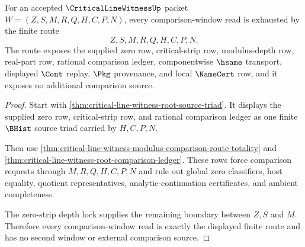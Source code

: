 \begin{theorem}
\label{thm:critical-line-witness-comparison-window-totality}
For an accepted $\CriticalLineWitnessUp$ packet $W=(Z,S,M,R,Q,H,C,P,N)$, every comparison-window read is exhausted by the finite route
$$
Z,S,M,R,Q,H,C,P,N.
$$
The route exposes the supplied zero row, critical-strip row, modulus-depth row, real-part row, rational comparison ledger, componentwise $\hsame$ transport, displayed $\Cont$ replay, $\Pkg$ provenance, and local $\NameCert$ row, and it exposes no additional comparison source.
\end{theorem}
\begin{proof}
Start with \autoref{thm:critical-line-witness-root-source-triad}. It displays the supplied zero row, critical-strip row, and rational comparison ledger as one finite $\BHist$ source triad carried by $H,C,P,N$.

Then use \autoref{thm:critical-line-witness-modulus-comparison-route-totality} and \autoref{thm:critical-line-witness-root-comparison-ledger}. These rows force comparison requests through $M,R,Q,H,C,P,N$ and rule out global zero classifiers, host equality, quotient representatives, analytic-continuation certificates, and ambient completeness.

The zero-strip depth lock supplies the remaining boundary between $Z,S$ and $M$. Therefore every comparison-window read is exactly the displayed finite route and has no second window or external comparison source.
\end{proof}

